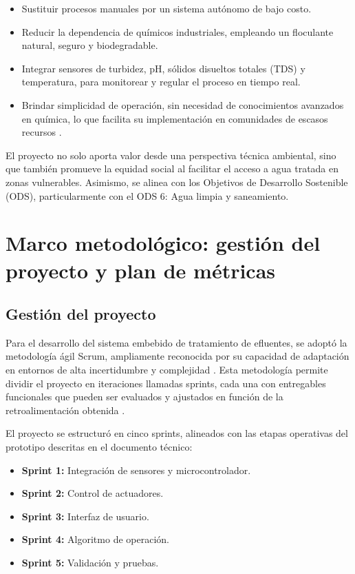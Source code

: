 \documentclass[conference]{IEEEtran}
\begin{document}
	\begin{itemize}
		\item Sustituir procesos manuales por un sistema autónomo de bajo costo.
		
		\item Reducir la dependencia de químicos industriales, empleando un floculante natural, seguro y biodegradable.
		
		\item Integrar sensores de turbidez, pH, sólidos disueltos totales (TDS) y temperatura, para monitorear y regular el proceso en tiempo real.
		
		\item Brindar simplicidad de operación, sin necesidad de conocimientos avanzados en química, lo que facilita su implementación en comunidades de escasos recursos \cite{b7}.
		
	\end{itemize}
	
	El proyecto no solo aporta valor desde una perspectiva técnica ambiental, sino que también promueve la equidad social al facilitar el acceso a agua tratada en zonas vulnerables. Asimismo, se alinea con los Objetivos de Desarrollo Sostenible (ODS), particularmente con el ODS 6: Agua limpia y saneamiento.
	
	\section{Marco metodológico: gestión del proyecto y plan de métricas}
	
	\subsection{Gestión del proyecto}
	
	Para el desarrollo del sistema embebido de tratamiento de efluentes, se adoptó la metodología ágil Scrum, ampliamente reconocida por su capacidad de adaptación en entornos de alta incertidumbre y complejidad \cite{b8}. Esta metodología permite dividir el proyecto en iteraciones llamadas sprints, cada una con entregables funcionales que pueden ser evaluados y ajustados en función de la retroalimentación obtenida \cite{b8}.
	
	El proyecto se estructuró en cinco sprints, alineados con las etapas operativas del prototipo descritas en el documento técnico:
	
	\begin{itemize}
		\item \textbf{Sprint 1:} Integración de sensores y microcontrolador.
		\item \textbf{Sprint 2:} Control de actuadores.
		\item \textbf{Sprint 3:} Interfaz de usuario.
		\item \textbf{Sprint 4:} Algoritmo de operación.
		\item \textbf{Sprint 5:} Validación y pruebas.
	\end{itemize}
	
\end{document}
